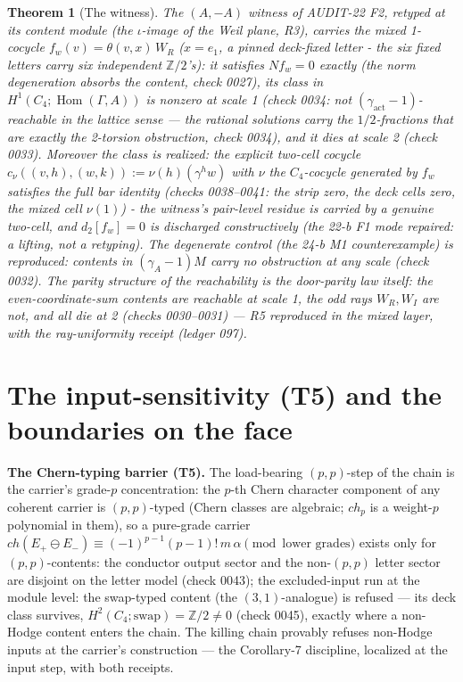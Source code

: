 \documentclass[11pt]{article}
\newtheorem{theorem}{Theorem}
\newcommand{\GammaL}{\Gamma}
\newcommand{\Cfour}{C_4}
\newcommand{\Hom}{\operatorname{Hom}}
\newcommand{\Z}{\mathbb{Z}}
\begin{document}
\begin{theorem}[The witness]
The $(A,-A)$ witness of AUDIT-22 F2, retyped at its content module
(the $\iota$-image of the Weil plane, R3), carries the mixed 1-cocycle
$f_w(v)=\theta(v,x)\,W_R$ ($x=e_1$, a pinned deck-fixed letter - the six
fixed letters carry six independent $\Z/2$'s): it satisfies
$N f_w=0$ exactly (the norm degeneration absorbs the content, check
0027), its class in $H^1(\Cfour;\Hom(\GammaL,A))$ is \emph{nonzero at
scale 1} (check 0034: not $(\gamma_{\mathrm{act}}-1)$-reachable in the
\emph{lattice} sense — the rational solutions carry the $1/2$-fractions
that are exactly the 2-torsion obstruction, check 0034), and it
\emph{dies at scale 2} (check 0033). Moreover the class is
\emph{realized}: the explicit two-cell cocycle
$c_\nu((v,h),(w,k)):=\nu(h)(\gamma^h w)$ with $\nu$ the $\Cfour$-cocycle
generated by $f_w$ satisfies the full bar identity (checks
0038--0041: the strip zero, the deck cells zero, the mixed cell
$\nu(1)$) - the witness's pair-level residue is carried by a genuine
two-cell, and $d_2[f_w]=0$ is discharged constructively (the 22-b F1
mode repaired: a lifting, not a retyping). The degenerate control (the 24-b
M1 counterexample) is reproduced: contents in
$(\gamma_A-1)M$ carry no obstruction at any scale (check 0032). The
parity structure of the reachability is the door-parity law itself:
the even-coordinate-sum contents are reachable at scale 1, the odd rays
$W_R,W_I$ are not, and all die at 2 (checks 0030--0031) — R5
reproduced in the mixed layer, with the ray-uniformity receipt
(ledger 097).
\end{theorem}

\section{The input-sensitivity (T5) and the boundaries on the face}

\textbf{The Chern-typing barrier (T5).} The load-bearing $(p,p)$-step
of the chain is the carrier's grade-$p$ concentration: the
$p$-th Chern character component of any coherent carrier is
$(p,p)$-typed (Chern classes are algebraic; $ch_p$ is a weight-$p$
polynomial in them), so a pure-grade carrier
$ch(E_+\ominus E_-)\equiv (-1)^{p-1}(p-1)!\,m\,\alpha\pmod{\text{lower
grades}}$ exists only for $(p,p)$-contents: the conductor output sector
and the non-$(p,p)$ letter sector are disjoint on the letter model
(check 0043); the excluded-input run at the module level: the
swap-typed content (the $(3,1)$-analogue) is refused — its deck class
survives, $H^2(\Cfour;\mathrm{swap})=\Z/2\ne 0$ (check 0045), exactly
where a non-Hodge content enters the chain. The killing chain provably
refuses non-Hodge inputs at the carrier's construction — the
Corollary-7 discipline, localized at the input step, with both
receipts.
\end{document}
